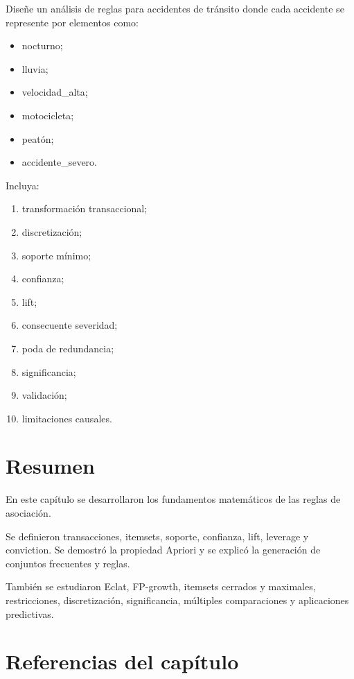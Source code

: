 \documentclass[
  spanish,
  10.5pt,
  letterpaper,
  DIV=11,
  numbers=noendperiod,
  oneside,
  open=any]{scrreprt}
\providecommand{\tightlist}{%
  \setlength{\itemsep}{0pt}\setlength{\parskip}{0pt}}
\theoremstyle{definition}
\theoremstyle{definition}
\theoremstyle{plain}
\theoremstyle{remark}
\begin{document}

Diseñe un análisis de reglas para accidentes de tránsito donde cada
accidente se represente por elementos como:

\begin{itemize}
\tightlist
\item
  nocturno;
\item
  lluvia;
\item
  velocidad\_alta;
\item
  motocicleta;
\item
  peatón;
\item
  accidente\_severo.
\end{itemize}

Incluya:

\begin{enumerate}
\def\labelenumi{\arabic{enumi}.}
\tightlist
\item
  transformación transaccional;
\item
  discretización;
\item
  soporte mínimo;
\item
  confianza;
\item
  lift;
\item
  consecuente severidad;
\item
  poda de redundancia;
\item
  significancia;
\item
  validación;
\item
  limitaciones causales.
\end{enumerate}

\section*{Resumen}\label{resumen-18}


En este capítulo se desarrollaron los fundamentos matemáticos de las
reglas de asociación.

Se definieron transacciones, itemsets, soporte, confianza, lift,
leverage y conviction. Se demostró la propiedad Apriori y se explicó la
generación de conjuntos frecuentes y reglas.

También se estudiaron Eclat, FP-growth, itemsets cerrados y maximales,
restricciones, discretización, significancia, múltiples comparaciones y
aplicaciones predictivas.

\section*{Referencias del
capítulo}\label{referencias-del-capuxedtulo-19}
\end{document}
